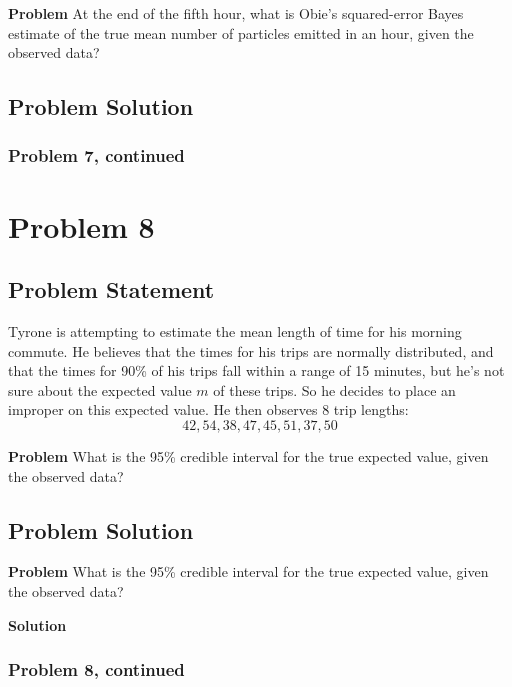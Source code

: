 \documentclass[12pt]{article}
\theoremstyle{definition}
\begin{document}
\bigskip
\noindent
{\bf Problem} At the end of the fifth hour, what is Obie's squared-error Bayes estimate of the true mean number of particles emitted in an hour, given the observed data?


\subsection*{Problem Solution}


\newpage
\subsubsection*{Problem 7, continued}




\newpage
\section*{Problem 8}

\subsection*{Problem Statement}

Tyrone is attempting to estimate the mean length of time for his morning commute. He believes that the times for his trips are normally distributed, and that the times for 90\% of his trips fall within a range of 15 minutes, but he's not sure about the expected value $m$ of these trips. So he decides to place an improper on this expected value. He then observes 8 trip lengths:
$$
42, 54, 38, 47, 45, 51, 37, 50
$$

\noindent
{\bf Problem} What is the 95\% credible interval for the true expected value, given the observed data?


\subsection*{Problem Solution}

\noindent
{\bf Problem} What is the 95\% credible interval for the true expected value, given the observed data?

\bigskip
\noindent
{\bf Solution} 


\newpage
\subsubsection*{Problem 8, continued}
\end{document}
